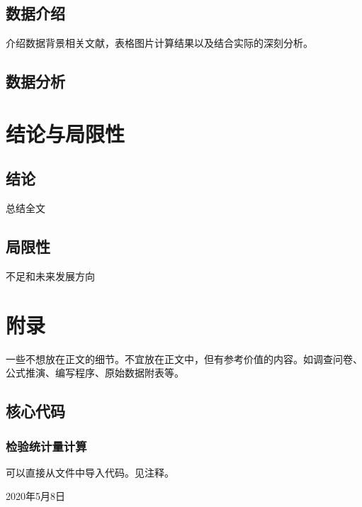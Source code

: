 \documentclass{SUFEThesis}
\begin{document}
\subsection{数据介绍}
介绍数据背景相关文献，表格图片计算结果以及结合实际的深刻分析。


\subsection{数据分析}


\section{结论与局限性}
\subsection{结论}
总结全文
\subsection{局限性}
不足和未来发展方向

\newpage


 
\section{附录}
一些不想放在正文的细节。不宜放在正文中，但有参考价值的内容。如调查问卷、 公式推演、编写程序、原始数据附表等。
\subsection{核心代码}
\subsubsection{检验统计量计算}
可以直接从文件中导入代码。见注释。
% 


\statement %
\hfill 2020年5月8日 %
\end{document}
